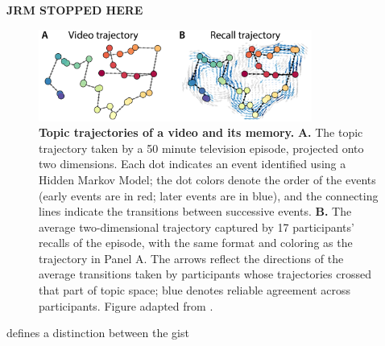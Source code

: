 \documentclass{article}
\begin{document}
\textbf{JRM STOPPED HERE}

\begin{figure}[tp]
\centering
\includegraphics[width=0.8\textwidth]{figs/trajectory}
\caption{\textbf{Topic trajectories of a video and its memory.}  \textbf{A.} The topic trajectory taken by a 50 minute television episode, projected onto two dimensions.  Each dot indicates an event identified using a Hidden Markov Model; the dot colors denote the order of the events (early events are in red; later events are in blue), and the connecting lines indicate the transitions between successive events.  \textbf{B.} The average two-dimensional trajectory captured by 17 participants' recalls of the episode, with the same format and coloring as the trajectory in Panel A. The arrows reflect the directions of the average transitions taken by participants whose trajectories crossed that part of topic space; blue denotes reliable agreement across participants.  Figure adapted from \cite{HeusEtal18c}.}
\label{fig:trajectories}
\end{figure}



defines a distinction between the gist
\end{document}
